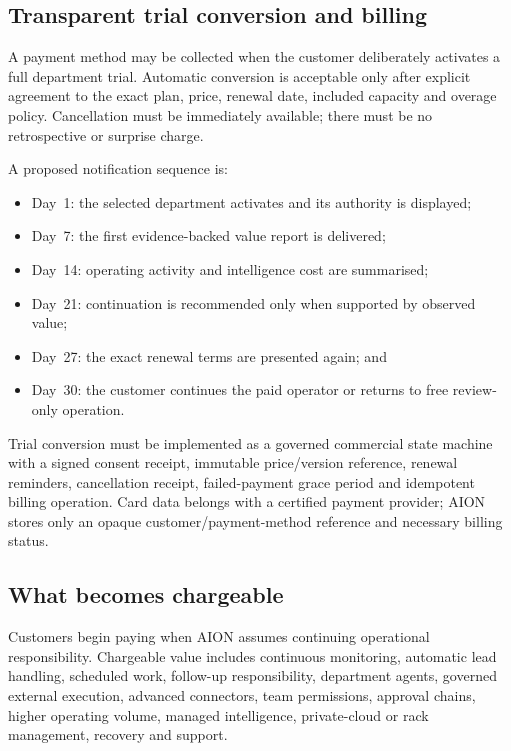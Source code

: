 \subsection{Transparent trial conversion and billing}

A payment method may be collected when the customer deliberately activates a full department
trial. Automatic conversion is acceptable only after explicit agreement to the exact plan, price,
renewal date, included capacity and overage policy. Cancellation must be immediately available;
there must be no retrospective or surprise charge.

A proposed notification sequence is:

\begin{itemize}
  \item Day~1: the selected department activates and its authority is displayed;
  \item Day~7: the first evidence-backed value report is delivered;
  \item Day~14: operating activity and intelligence cost are summarised;
  \item Day~21: continuation is recommended only when supported by observed value;
  \item Day~27: the exact renewal terms are presented again; and
  \item Day~30: the customer continues the paid operator or returns to free review-only operation.
\end{itemize}

Trial conversion must be implemented as a governed commercial state machine with a signed consent
receipt, immutable price/version reference, renewal reminders, cancellation receipt, failed-payment
grace period and idempotent billing operation. Card data belongs with a certified payment provider;
AION stores only an opaque customer/payment-method reference and necessary billing status.

\subsection{What becomes chargeable}

Customers begin paying when AION assumes continuing operational responsibility. Chargeable value
includes continuous monitoring, automatic lead handling, scheduled work, follow-up responsibility,
department agents, governed external execution, advanced connectors, team permissions, approval
chains, higher operating volume, managed intelligence, private-cloud or rack management, recovery
and support.

